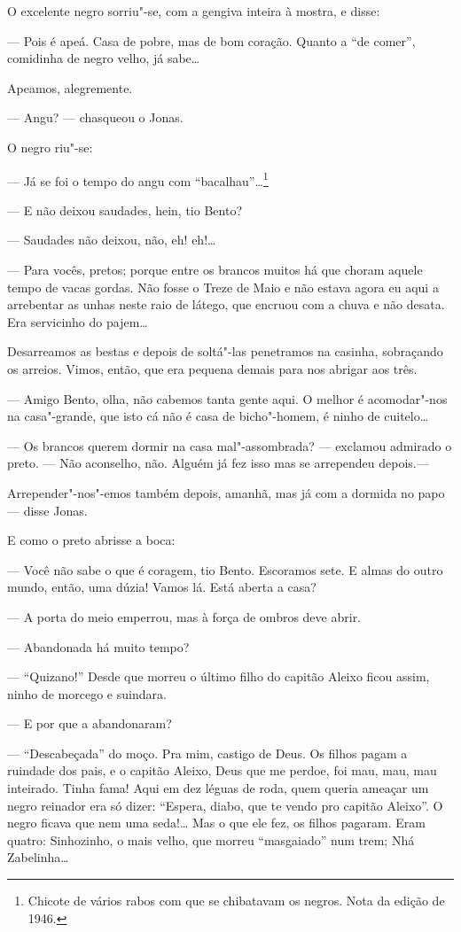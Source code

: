 O excelente negro sorriu"-se, com a gengiva inteira à mostra, e disse:

--- Pois é apeá. Casa de pobre, mas de bom coração. Quanto a ``de
comer'', comidinha de negro velho, já sabe\ldots{}

Apeamos, alegremente.

--- Angu? --- chasqueou o Jonas.

O negro riu"-se:

--- Já se foi o tempo do angu com ``bacalhau''\ldots{}\footnote{Chicote de
  vários rabos com que se chibatavam os negros. Nota da edição de 1946.}

--- E não deixou saudades, hein, tio Bento?

--- Saudades não deixou, não, eh! eh!\ldots{}

--- Para vocês, pretos; porque entre os brancos muitos há que choram
aquele tempo de vacas gordas. Não fosse o Treze de Maio e não estava
agora eu aqui a arrebentar as unhas neste raio de látego, que encruou
com a chuva e não desata. Era servicinho do pajem\ldots{}

Desarreamos as bestas e depois de soltá"-las penetramos na casinha,
sobraçando os arreios. Vimos, então, que era pequena demais para nos
abrigar aos três.

--- Amigo Bento, olha, não cabemos tanta gente aqui. O melhor é
acomodar"-nos na casa"-grande, que isto cá não é casa de bicho"-homem, é
ninho de cuitelo\ldots{}

--- Os brancos querem dormir na casa mal"-assombrada? --- exclamou
admirado o preto. --- Não aconselho, não. Alguém já fez isso mas se
arrependeu depois.---

Arrepender"-nos"-emos também depois, amanhã, mas já com a dormida no papo
--- disse Jonas.

E como o preto abrisse a boca:

--- Você não sabe o que é coragem, tio Bento. Escoramos sete. E almas do
outro mundo, então, uma dúzia! Vamos lá. Está aberta a casa?

--- A porta do meio emperrou, mas à força de ombros deve abrir.

--- Abandonada há muito tempo?

--- ``Quizano!'' Desde que morreu o último filho do capitão Aleixo ficou
assim, ninho de morcego e suindara.

--- E por que a abandonaram?

--- ``Descabeçada'' do moço. Pra mim, castigo de Deus. Os filhos pagam a
ruindade dos pais, e o capitão Aleixo, Deus que me perdoe, foi mau, mau,
mau inteirado. Tinha fama! Aqui em dez léguas de roda, quem queria
ameaçar um negro reinador era só dizer: ``Espera, diabo, que te vendo
pro capitão Aleixo''. O negro ficava que nem uma seda!\ldots{} Mas o que ele
fez, os filhos pagaram. Eram quatro: Sinhozinho, o mais velho, que
morreu ``masgaiado'' num trem; Nhá Zabelinha\ldots{}

